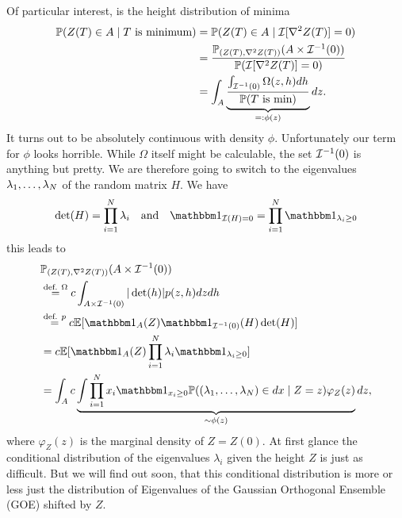 Of particular interest, is the height distribution of minima
\[\begin{aligned}
	\mathbb{P}(Z(T)\in A \mid T\text{ is minimum})
	&=\mathbb{P}(Z(T)\in A \mid \mathcal{I}[\nabla^2Z(T)]=0)\\
	&= \frac{\mathbb{P}_{(Z(T), \nabla^2Z(T))}(A\times \mathcal{I}^{-1}(0))}{\mathbb{P}(\mathcal{I}[\nabla^2Z(T)]=0)}\\
	&= \int_A \underbrace{
		\frac{\int_{\mathcal{I}^{-1}(0)} \Omega(z,h) dh}{\mathbb{P}(T\text{ is min})}
	}_{=: \phi(z)} dz.
\end{aligned}\]
It turns out to be absolutely continuous with density \(\phi\). Unfortunately
our term for \(\phi\) looks horrible. While \(\Omega\) itself might be
calculable, the set \(\mathcal{I}^{-1}(0)\) is anything but pretty. We are therefore
going to switch to the eigenvalues \(\lambda_1,\dots,\lambda_N\) of
the random matrix \(H\). We have
\[
	\det(H) = \prod_{i=1}^\dimension \lambda_i
	\quad\text{and}\quad
	\ind_{\negEV(H) = 0} = \prod_{i=1}^\dimension \ind_{\lambda_i\ge 0}
\]
this leads to 
\[\begin{aligned}
	&\Pr_{(\rf(T), \nabla^2\rf(T))}(A\times \negEV^{-1}(0))\\
	&\overset{\text{def. }\Omega}= c\int_{A\times\negEV^{-1}(0)} |\det(h)| p(z,h)dz dh\\
	&\overset{\text{def. } p}= c\E[\ind_{A}(Z)\ind_{\negEV^{-1}(0)}(H)\det(H)]\\
	&= c\E[\ind_{A}(Z)\prod_{i=1}^\dimension \lambda_i \ind_{\lambda_i \ge 0}]\\
	&= \int_A c\underbrace{
		\int \prod_{i=1}^\dimension x_i \ind_{x_i\ge 0}
		\Pr((\lambda_1,\dots,\lambda_\dimension)\in dx\mid Z=z) \varphi_Z(z)
	}_{\sim\phi(z)}
	dz,
\end{aligned}\]
where \(\varphi_Z(z)\) is the marginal density of \(Z=Z(0)\). At first glance
the conditional distribution of the eigenvalues \(\lambda_i\) given the
height \(Z\) is just as difficult. But we will find out soon, that this
conditional distribution is more or less just the distribution of Eigenvalues of
the Gaussian Orthogonal Ensemble (GOE) shifted by \(Z\).
